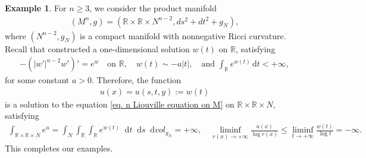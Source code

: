 \documentclass[12pt]{amsart}
\theoremstyle{plain}
\theoremstyle{definition}
\newtheorem{example}[theorem]{Example}
\theoremstyle{remark}     %
\newcommand{\dd}{\mathop{}\!\mathrm{d}}%
\begin{document}
\begin{example}
    For $n\geq 3$, we consider the product manifold
    \begin{align*}
        (M^n,g)=
        \left(\mathbb{R}\times\mathbb{R}\times N^{n-2},ds^2+dt^2+g_N\right),
    \end{align*}
    where $(N^{n-2},g_N)$ is a compact manifold with nonnegative Ricci curvature.
    Recall that \cite[Example 4.5]{CMR26} constructed a one-dimensional solution $w(t)$ on $\mathbb{R}$, satisfying
    \begin{align*}
        -(|w'|^{n-2}w')'=e^w\quad \text{on }\mathbb{R},\quad 
        w(t)\sim -a|t|,\quad \text{and }
        \int_{\mathbb{R}}e^{w(t)}\,\text{d}t<+\infty,
    \end{align*}
    for some constant $a>0$. Therefore, the function 
    \begin{align*}
        u(x)=u(s,t,y):=w(t)
    \end{align*}
    is a solution to the equation \cref{eq. n Liouville equation on M} on $\mathbb{R}\times\mathbb{R}\times N$, satisfying
    \begin{align*}
         \int
         _{\mathbb{R}\times\mathbb{R}\times N} e^u
        =\int_N
        \int_{\mathbb{R}}
        \int_{\mathbb{R}}e^{w(t)}
        \dd t\dd s \dd vol_{g_N}
        =+\infty,\quad 
        \liminf_{r(x)\to+\infty}
        \frac{u(x)}{\log r(x)}
        \leq \liminf_{t\to +\infty}
        \frac{w(t)}{\log t}
        =-\infty.       
    \end{align*}
    This completes our examples.
\end{example}
\end{document}
